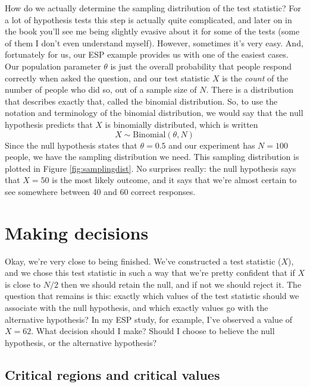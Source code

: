 \documentclass[
]{book}
\begin{document}
How do we actually determine the sampling distribution of the test statistic? For a lot of hypothesis tests this step is actually quite complicated, and later on in the book you'll see me being slightly evasive about it for some of the tests (some of them I don't even understand myself). However, sometimes it's very easy. And, fortunately for us, our ESP example provides us with one of the easiest cases. Our population parameter \(\theta\) is just the overall probability that people respond correctly when asked the question, and our test statistic \(X\) is the \emph{count} of the number of people who did so, out of a sample size of \(N\). There is a distribution that describes exactly that, called the binomial distribution. So, to use the notation and terminology of the binomial distribution, we would say that the null hypothesis predicts that \(X\) is binomially distributed, which is written
\[
X \sim \mbox{Binomial}(\theta,N)
\]
Since the null hypothesis states that \(\theta = 0.5\) and our experiment has \(N=100\) people, we have the sampling distribution we need. This sampling distribution is plotted in Figure \ref{fig:samplingdist}. No surprises really: the null hypothesis says that \(X=50\) is the most likely outcome, and it says that we're almost certain to see somewhere between 40 and 60 correct responses.

\hypertarget{decisionmaking}{%
\section{Making decisions}\label{decisionmaking}}

Okay, we're very close to being finished. We've constructed a test statistic (\(X\)), and we chose this test statistic in such a way that we're pretty confident that if \(X\) is close to \(N/2\) then we should retain the null, and if not we should reject it. The question that remains is this: exactly which values of the test statistic should we associate with the null hypothesis, and which exactly values go with the alternative hypothesis? In my ESP study, for example, I've observed a value of \(X=62\). What decision should I make? Should I choose to believe the null hypothesis, or the alternative hypothesis?

\hypertarget{critical-regions-and-critical-values}{%
\subsection{Critical regions and critical values}\label{critical-regions-and-critical-values}}
\end{document}
